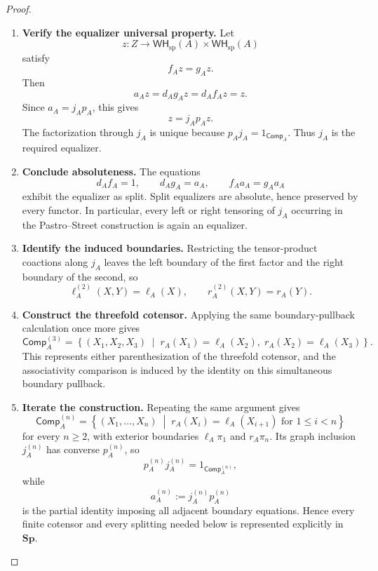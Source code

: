 \documentclass[oneside]{article}
\newcommand{\WH}{\mathsf{WH}}
\newcommand{\Sp}{\mathbf{Sp}}
\theoremstyle{plain}
\theoremstyle{definition}
\theoremstyle{remark}
\begin{document}
\begin{proof}
\begin{enumerate}[beginpenalty=10000]
        \item \textbf{Verify the equalizer universal property.} Let
        \[
            z:
            Z
            \longrightarrow
            \WH_{\mathrm{sp}}(A)\times\WH_{\mathrm{sp}}(A)
        \]
        satisfy
        \[
            f_Az=g_Az.
        \]
        Then
        \[
            a_Az
            =
            d_Ag_Az
            =
            d_Af_Az
            =
            z.
        \]
        Since \(a_A=j_Ap_A\), this gives
        \[
            z=j_Ap_Az.
        \]
        The factorization through \(j_A\) is unique because \(p_Aj_A=1_{\mathsf{Comp}_A}\). Thus \(j_A\) is the required equalizer.

        \item \textbf{Conclude absoluteness.} The equations
        \[
            d_Af_A=1,
            \qquad
            d_Ag_A=a_A,
            \qquad
            f_Aa_A=g_Aa_A
        \]
        exhibit the equalizer as split. Split equalizers are absolute, hence preserved by every functor. In particular, every left or right tensoring of \(j_A\) occurring in the Pastro--Street construction is again an equalizer.

        \item \textbf{Identify the induced boundaries.} Restricting the tensor-product coactions along \(j_A\) leaves the left boundary of the first factor and the right boundary of the second, so
        \[
            \ell_A^{(2)}(X,Y)=\ell_A(X),
            \qquad
            r_A^{(2)}(X,Y)=r_A(Y).
        \]

        \item \textbf{Construct the threefold cotensor.} Applying the same boundary-pullback calculation once more gives
        \[
            \mathsf{Comp}_A^{(3)}
            =
            \left\{
                (X_1,X_2,X_3)
                \;\middle|\;
                r_A(X_1)=\ell_A(X_2),\;
                r_A(X_2)=\ell_A(X_3)
            \right\}.
        \]
        This represents either parenthesization of the threefold cotensor, and the associativity comparison is induced by the identity on this simultaneous boundary pullback.

        \item \textbf{Iterate the construction.} Repeating the same argument gives
        \[
            \mathsf{Comp}_A^{(n)}
            =
            \left\{
                (X_1,\ldots,X_n)
                \;\middle|\;
                r_A(X_i)=\ell_A(X_{i+1})
                \text{ for }1\leq i<n
            \right\}
        \]
        for every \(n\geq2\), with exterior boundaries \(\ell_A\pi_1\) and \(r_A\pi_n\). Its graph inclusion \(j_A^{(n)}\) has converse \(p_A^{(n)}\), so
        \[
            p_A^{(n)}j_A^{(n)}
            =
            1_{\mathsf{Comp}_A^{(n)}},
        \]
        while
        \[
            a_A^{(n)}
            :=
            j_A^{(n)}p_A^{(n)}
        \]
        is the partial identity imposing all adjacent boundary equations. Hence every finite cotensor and every splitting needed below is represented explicitly in \(\Sp\). \qedhere
    \end{enumerate}
\end{proof}
\end{document}
